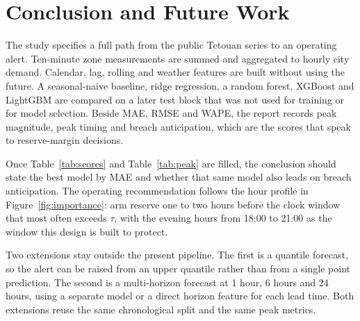 \section{Conclusion and Future Work}
\label{sec:conclusion}

The study specifies a full path from the public Tetouan series to an
operating alert. Ten-minute zone measurements are summed and aggregated to
hourly city demand. Calendar, lag, rolling and weather features are built
without using the future. A seasonal-naive baseline, ridge regression, a
random forest, XGBoost and LightGBM are compared on a later test block that
was not used for training or for model selection. Beside MAE, RMSE and WAPE,
the report records peak magnitude, peak timing and breach anticipation, which
are the scores that speak to reserve-margin decisions.

Once Table~\ref{tab:scores} and Table~\ref{tab:peak} are filled, the
conclusion should state the best model by MAE and whether that same model
also leads on breach anticipation. The operating recommendation follows the
hour profile in Figure~\ref{fig:importance}: arm reserve one to two hours
before the clock window that most often exceeds \(\tau\), with the evening
hours from 18:00 to 21:00 as the window this design is built to protect.

Two extensions stay outside the present pipeline. The first is a quantile
forecast, so the alert can be raised from an upper quantile rather than from
a single point prediction. The second is a multi-horizon forecast at 1 hour,
6 hours and 24 hours, using a separate model or a direct horizon feature for
each lead time. Both extensions reuse the same chronological split and the
same peak metrics.
